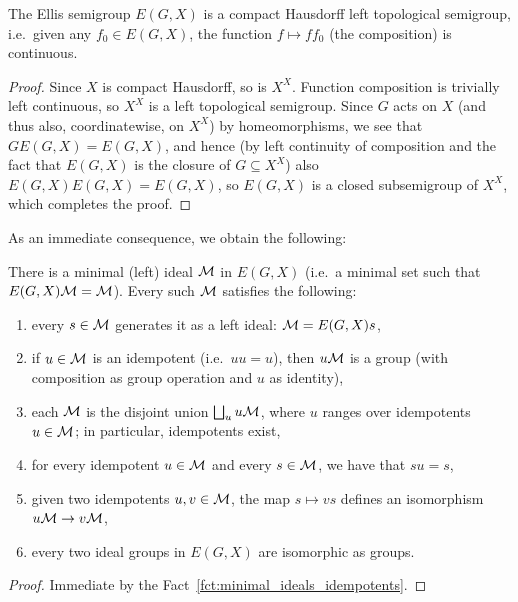 	\begin{fct}
		The Ellis semigroup $E(G,X)$ is a compact Hausdorff left topological semigroup, i.e.\ given any $f_0\in E(G,X)$, the function $f\mapsto ff_0$ (the composition) is continuous.
	\end{fct}
	\begin{proof}
		Since $X$ is compact Hausdorff, so is $X^X$. Function composition is trivially left continuous, so $X^X$ is a left topological semigroup. Since $G$ acts on $X$ (and thus also, coordinatewise, on $X^X$) by homeomorphisms, we see that $GE(G,X)=E(G,X)$, and hence (by left continuity of composition and the fact that $E(G,X)$ is the closure of $G\subseteq X^X$) also $E(G,X)E(G,X)=E(G,X)$, so $E(G,X)$ is a closed subsemigroup of $X^X$, which completes the proof.
	\end{proof}
	As an immediate consequence, we obtain the following:
	\begin{fct}
		\label{fct:idempotents_ideals_Ellis}
		There is a minimal (left) ideal ${\mathcal M}$ in $E(G,X)$ (i.e.\ a minimal set such that $E(G,X){\mathcal M}={\mathcal M}$). Every such ${\mathcal M}$ satisfies the following:
		\begin{enumerate}
			\item
			every $s\in {\mathcal M}$ generates it as a left ideal: ${\mathcal M}=E(G,X)s$,
			\item
			if $u\in {\mathcal M}$ is an idempotent (i.e.\ $uu=u$), then $u{\mathcal M}$ is a group (with composition as group operation and $u$ as identity),
			\item
			each ${\mathcal M}$ is the disjoint union $\bigsqcup_{u} u{\mathcal M}$, where $u$ ranges over idempotents $u\in {\mathcal M}$; in particular, idempotents exist,
			\item
			for every idempotent $u\in {\mathcal M}$ and every $s\in {\mathcal M}$, we have that $su=s$,
			\item
			given two idempotents $u,v\in {\mathcal M}$, the map $s\mapsto vs$ defines an isomorphism $u{\mathcal M}\to v{\mathcal M}$,
			\item
			every two ideal groups in $E(G,X)$ are isomorphic as groups.
		\end{enumerate}
	\end{fct}
	\begin{proof}
		Immediate by the Fact~\ref{fct:minimal_ideals_idempotents}.
	\end{proof}
	
